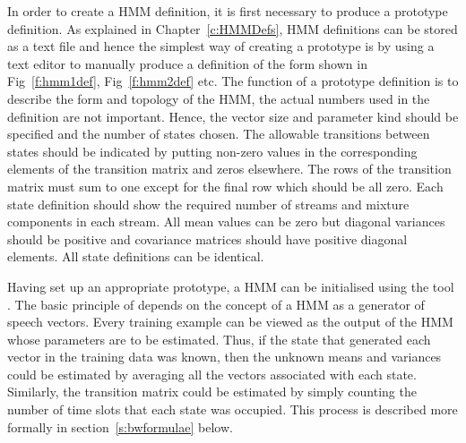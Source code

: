 In order to create a HMM definition, it is first necessary to produce
a prototype definition.  As explained in Chapter~\ref{c:HMMDefs}, HMM definitions
can be stored as a text file and hence the simplest way of creating
a prototype is by using a text editor to manually produce a definition of the form
shown in Fig~\ref{f:hmm1def}, Fig~\ref{f:hmm2def} etc.  The function of a prototype
definition is to describe the form and topology of the HMM,  the actual numbers used
in the definition are not important.   Hence, the vector size and parameter kind should
be specified and the number of states chosen.  The allowable transitions between states
should be indicated by putting non-zero values in the corresponding elements of the
transition matrix and zeros elsewhere.  The rows of the transition matrix must sum to one
except for the final row which should be all zero.  Each state definition should show the
required number of streams and mixture components in each stream.  All mean values
can be zero but diagonal variances should be positive and covariance matrices
should have positive diagonal elements.  All state definitions can be identical.

Having set up an appropriate prototype, a HMM can be initialised using the \HTK tool
.   The basic principle of  depends on the concept of a HMM as
a generator of speech vectors.  Every training example can be viewed as the output
of the HMM whose parameters are to be estimated.  
Thus, if the state that generated each vector in the training
data was known, then the unknown means and variances could be estimated by averaging all the
vectors associated with each state.  Similarly, the transition matrix could be estimated
by simply counting the number of time slots that each state was occupied.  This process
is described more formally in section~\ref{s:bwformulae} below.

